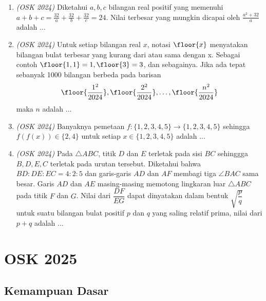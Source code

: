 \begin{enumerate}
	\item \textit{(OSK 2024)} Diketahui $a,b,c$ bilangan real positif yang memenuhi $a+b+c = \frac{32}{a}+\frac{32}{b}+\frac{32}{c} = 24$. Nilai terbesar yang mungkin dicapai oleh $\frac{a^2+32}{a}$ adalah $\dots$
	
	\item \textit{(OSK 2024)} Untuk setiap bilangan real $x$, notasi $\floor{x}$ menyatakan bilangan bulat terbesar yang kurang dari atau sama dengan x. Sebagai contoh $\floor{1,1} = 1,\floor{3} = 3$, dan sebagainya. Jika ada tepat sebanyak 1000 bilangan berbeda pada barisan
	\[
	\floor{\frac{1^2}{2024}},\floor{\frac{2^2}{2024}}, \dots, \floor{\frac{n^2}{2024}}
	\]
	maka $n$ adalah $\dots$
	
	
	\item \textit{(OSK 2024)} Banyaknya pemetaan $f:\{1,2,3,4,5\}\to\{1,2,3,4,5\}$ sehingga $f(f(x))\in\{2,4\}$ untuk setiap $x\in \{1,2,3,4,5\}$ adalah $\dots$
	
	\item \textit{(OSK 2024)} Pada $\triangle ABC$, titik $D$ dan $E$ terletak pada sisi $BC$ sehinggga $B, D, E, C$ terletak pada urutan tersebut. Diketahui bahwa $BD : DE : EC = 4 : 2 : 5$ dan garis-garis $AD$ dan $AF$ membagi tiga $\angle BAC$ sama besar. Garis $AD$ dan $AE$ masing-masing memotong lingkaran luar $\triangle ABC$ pada titik $F$ dan $G$. Nilai dari $\dfrac{DF}{EG}$ dapat dinyatakan dalam bentuk $\sqrt{\dfrac{p}{q}}$ untuk suatu bilangan bulat positif $p$ dan $q$ yang saling relatif prima, nilai dari $p + q$ adalah $\dots$
\end{enumerate}
\newpage
\section{OSK 2025}
\subsection{Kemampuan Dasar}

